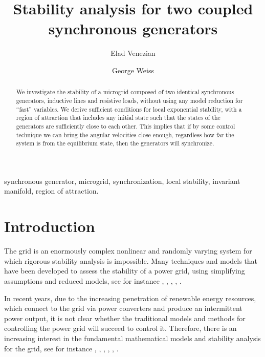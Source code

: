\documentclass{ifacconf}
\begin{document}
\begin{frontmatter}

\title{Stability analysis for two coupled synchronous generators}
\author[First]{Elad Venezian}
\author[Second]{George Weiss}

\address[First]{School of EE, Tel Aviv University Ramat Aviv 69978, 
        Israel \\ (e-mail: eladv@gmail.com)}
\address[Second]{School of EE, Tel Aviv University Ramat Aviv 69978, 
        Israel \\ (e-mail: gweiss@eng.tau.ac.il)}

\begin{abstract}
We investigate the stability of a microgrid composed of two identical
synchronous generators, inductive lines and resistive loads, without
using any model reduction for ``fast'' variables. We derive sufficient
conditions for local exponential stability, with a region of
attraction that includes any initial state such that the states of the
generators are sufficiently close to each other. This implies that if
by some control technique we can bring the angular velocities close
enough, regardless how far the system is from the equilibrium state,
then the generators will synchronize.
\end{abstract}

\begin{keyword}
synchronous generator, microgrid, synchronization, local stability, 
invariant manifold, region of attraction. 
\end{keyword}

\end{frontmatter}

\section{Introduction}

The grid is an enormously complex nonlinear and randomly varying 
system for which rigorous stability analysis is impossible. 
Many techniques and models that have been developed to assess the 
stability of a power grid, using simplifying assumptions and reduced
models, see for instance \cite{Kundur}, \cite{GrSt2014}, 
\cite{SauerPai1998}, \cite{GOBS:03}, \cite{DoBull:12}.

In recent years, due to the increasing penetration of renewable energy
resources, which connect to the grid via power converters and produce
an intermittent power output, it is not clear whether the traditional
models and methods for controlling the power grid will succeed to
control it. Therefore, there is an increasing interest in the
fundamental mathematical models and stability analysis for the grid,
see for instance \cite{DoBull:12}, \cite{PoDoBu:13}, \cite{CaTa:14},
\cite{NaWe:14}, \cite{NaWe:15}, \cite{DePersiSchaft:16}.
\end{document}
